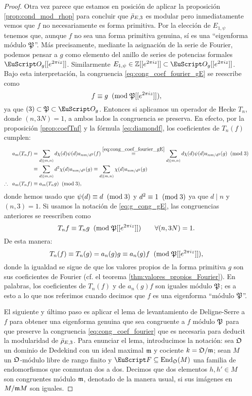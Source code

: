 \documentclass[../../tesis_maestria]{subfiles}
\begin{document}
\begin{proof}
  Otra vez parece que estamos en posici\'on de aplicar la proposici\'on \ref{prop:cond_mod_rhop} para concluir que $\bar{\rho}_{E,3}$ es modular pero inmediatamente vemos que $f$ no necesariamente es forma primitiva. Por la elecci\'on de $E_{1,\psi}$ tenemos que, aunque $f$ no sea una forma primitiva genuina, s\'i es una ``eigenforma m\'odulo $\mathfrak{P}$''. M\'as precisamente, mediante la asignaci\'on de la serie de Fourier, podemos pensar a $g$ como elemento del anillo de series de potencias formales $\Oo_g[[e^{2\pi iz}]]$. Similarmente $E_{1,\psi}\in\ZZ[[e^{2\pi iz}]]\subset\Oo_g[[e^{2\pi iz}]]$. Bajo esta interpretaci\'on, la congruencia \eqref{eq:cong_coef_fourier_gE} se reescribe como
  \begin{equation}\label{eq:g_cong_gE}
    f\equiv g \;\;(\mathrm{mod}\; \mathfrak{P}[[e^{2\pi iz}]]),
  \end{equation}
  ya que $(3)\subset\fP\subset\Oo_g$. Entonces si aplicamos un operador de Hecke $T_n$, donde $(n,3N)=1$, a ambos lados la congruencia se preserva. En efecto, por la proposici\'on \ref{prop:coefTnf} y la f\'ormula \ref{eq:diamondf}, los coeficientes de $T_n(f)$ cumplen:
  \begin{align*}
    a_m(T_nf)
    &=\sum_{d\mid (m,n)}d \chi(d)\psi(d)a_{nm/d^2}(f)\overset{\eqref{eq:cong_coef_fourier_gE}}{\equiv}\sum_{d\mid (m,n)}d \chi(d)\psi(d)a_{nm/d^2}(g)\;\;(\mathrm{mod}\; 3)\\
    &\equiv \sum_{d\mid (m,n)}d^2 \chi(d) a_{nm/d^2}(g)\equiv\sum_{d\mid (m,n)}\chi(d) a_{nm/d^2}(g)\\
    \therefore\;\; a_m(T_nf)
    &\equiv a_m(T_ng)\;\;(\mathrm{mod}\; 3),
  \end{align*}
  donde hemos usado que $\psi(d)\equiv d\;\;(\mathrm{mod}\; 3)$ y $d^2\equiv1\;\;(\mathrm{mod}\; 3)$ ya que $d\mid n$ y $(n,3)=1$. Si usamos la notaci\'on de \eqref{eq:g_cong_gE}, las congruencias anteriores se reescriben como
  \[
    T_nf\equiv T_ng \;\;(\mathrm{mod}\; \mathfrak{P}[[e^{2\pi iz}]])\qquad\forall(n,3N)=1.
  \]
  De esta manera: 
  \[
    T_n(f)\equiv T_n(g)=a_n(g)g\equiv a_n(g)f\;\;(\mathrm{mod}\; \mathfrak{P}[[e^{2\pi iz}]]),
  \]
  donde la igualdad se sigue de que los valores propios de la forma primitiva $g$ son sus coeficientes de Fourier (cf. el teorema \ref{thm:valores_propios_Fourier}). En palabras, los coeficientes de $T_n(f)$ y de $a_n(g)f$ son iguales módulo $\mathfrak{P}$; es a esto a lo que nos referimos cuando decimos que $f$ es una eigenforma ``m\'odulo $\mathfrak{P}$''.
 
  
  El siguiente y \'ultimo paso es aplicar el lema de levantamiento de Deligne-Serre a $f$ para obtener una eigenforma genuina que sea congruente a $f$ m\'odulo $\mathfrak{P}$ para que preserve la congruencia \eqref{eq:cong_coef_fourier} que es necesaria para deducit la modularidad de $\bar{\rho}_{E,3}$. Para enunciar el lema, introducimos la notaci\'on: sea $\mathfrak{O}$ un dominio de Dedekind con un ideal maximal $\mathfrak{m}$ y cociente $k=\mathfrak{O}/\mathfrak{m}$; sean $M$ un $\mathfrak{O}$-m\'odulo libre de rango finito y $\Ff\subseteq\End_{\fO}(M)$ una familia de endomorfismos que conmutan dos a dos. Decimos que dos elementos $h,h'\in M$ son congruentes m\'odulo $\mathfrak{m}$, denotado de la manera usual, si sus im\'agenes en $M/\mathfrak{m} M$ son iguales.


\end{proof}
\end{document}
